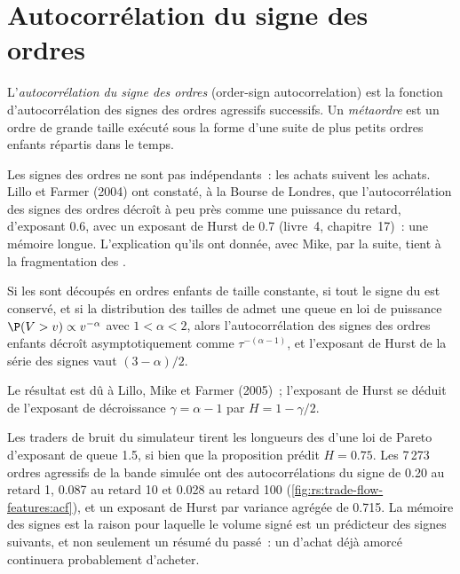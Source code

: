 \section{Autocorrélation du signe des ordres}

\begin{definition}\label{def:rs:trade-flow-features:acf}
L'\emph{autocorrélation du signe des ordres} (order-sign autocorrelation) est la fonction d'autocorrélation des signes des
ordres agressifs successifs. Un \emph{métaordre} est un ordre de grande taille exécuté sous la forme d'une suite de plus petits ordres enfants répartis dans le temps.
\end{definition}

Les signes des ordres ne sont pas indépendants~: les achats suivent les achats. Lillo et Farmer (2004) ont constaté, à la Bourse de Londres, que
l'autocorrélation des signes des ordres décroît à peu près comme une puissance du retard, d'exposant 0.6, avec un exposant de Hurst de 0.7 (livre~4,
chapitre~17)~: une mémoire longue. L'explication qu'ils ont donnée, avec Mike, par la suite, tient à la fragmentation des .

\begin{proposition}\label{prop:rs:trade-flow-features:lmf}
Si les  sont découpés en ordres enfants de taille constante, si tout le signe du  est conservé, et si la distribution des tailles de  admet une
queue en loi de puissance $\P(V > v) \propto v^{-\alpha}$ avec $1 < \alpha < 2$, alors l'autocorrélation des signes des ordres enfants décroît asymptotiquement comme
$\tau^{-(\alpha - 1)}$, et l'exposant de Hurst de la série des signes vaut $(3 - \alpha)/2$.
\end{proposition}

\admitted
\noindent Le résultat est dû à Lillo, Mike et Farmer (2005)~; l'exposant de Hurst se déduit de l'exposant de décroissance $\gamma = \alpha - 1$ par
$H = 1 - \gamma/2$.

Les traders de bruit du simulateur tirent les longueurs des  d'une loi de Pareto d'exposant de queue 1.5, si bien que la proposition prédit $H = 0.75$. Les
7\,273 ordres agressifs de la bande simulée ont des autocorrélations du signe de 0.20 au retard 1, 0.087 au retard 10 et 0.028 au retard 100
(\cref{fig:rs:trade-flow-features:acf}), et un exposant de Hurst par variance agrégée de 0.715. La mémoire des signes est la raison pour laquelle le volume signé est
un prédicteur des signes suivants, et non seulement un résumé du passé~: un  d'achat déjà amorcé continuera probablement d'acheter.

